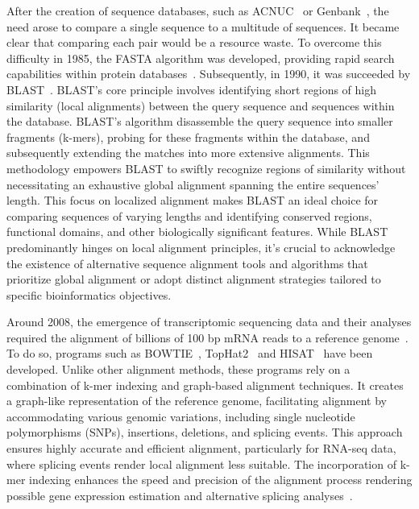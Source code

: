 After the creation of sequence databases, such as ACNUC~\citep{gouy_acnuc--portable_1985} or Genbank~\citep{burks_genbank_1991}, the need arose to compare a single sequence to a multitude of sequences. It became clear that comparing each pair would be a resource waste. To overcome this difficulty in 1985, the FASTA algorithm was developed, providing rapid search capabilities within protein databases~\citep{lipman_rapid_1985}. Subsequently, in 1990, it was succeeded by BLAST~\citep{altschul_basic_1990}. BLAST's core principle involves identifying short regions of high similarity (local alignments) between the query sequence and sequences within the database. BLAST's algorithm disassemble the query sequence into smaller fragments (k-mers), probing for these fragments within the database, and subsequently extending the matches into more extensive alignments. This methodology empowers BLAST to swiftly recognize regions of similarity without necessitating an exhaustive global alignment spanning the entire sequences' length. This focus on localized alignment makes BLAST an ideal choice for comparing sequences of varying lengths and identifying conserved regions, functional domains, and other biologically significant features. While BLAST predominantly hinges on local alignment principles, it's crucial to acknowledge the existence of alternative sequence alignment tools and algorithms that prioritize global alignment or adopt distinct alignment strategies tailored to specific bioinformatics objectives.

Around 2008, the emergence of transcriptomic sequencing data and their analyses required the alignment of billions of 100 \acrshort{bp} \acrshort{mRNA} reads to a reference genome~\citep{mortazavi_mapping_2008}. To do so, programs such as BOWTIE~\citep{langmead_ultrafast_2009}, TopHat2~\citep{kim_tophat2_2013} and HISAT~\citep{kim_graph-based_2019} have been developed. Unlike other alignment methods, these programs rely on a combination of k-mer indexing and graph-based alignment techniques. It creates a graph-like representation of the reference genome, facilitating alignment by accommodating various genomic variations, including single nucleotide polymorphisms (\acrshort{SNP}s), insertions, deletions, and splicing events. This approach ensures highly accurate and efficient alignment, particularly for RNA-seq data, where splicing events render local alignment less suitable. The incorporation of k-mer indexing enhances the speed and precision of the alignment process rendering possible gene expression estimation and alternative splicing analyses~\citep{kim_graph-based_2019}.


